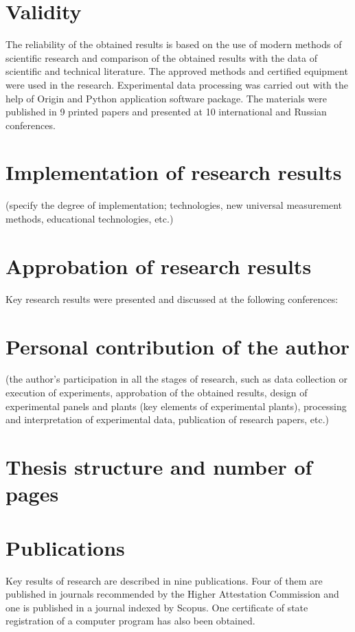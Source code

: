\section*{Validity}
The reliability of the obtained results is based on the use of modern methods of scientific research and comparison of the obtained results with the data of scientific and technical literature. The approved methods and certified equipment were used in the research. Experimental data processing was carried out with the help of Origin and Python application software package. The materials were published in 9 printed papers and presented at 10 international and Russian conferences.

\section*{Implementation of research results}
(specify the degree of implementation; technologies, new universal measurement methods, educational technologies, etc.)

\section*{Approbation of research results}
Key research results were presented and discussed at the following conferences:

\section*{Personal contribution of the author}
(the author's participation in all the stages of research, such as data collection or execution of experiments, approbation of the obtained results, design of experimental panels and plants (key elements of experimental plants), processing and interpretation of experimental data, publication of research papers, etc.)

\section*{Thesis structure and number of pages}
\section*{Publications}
Key results of research are described in nine publications. Four of them are published in journals recommended by the Higher Attestation Commission and one is published in a journal indexed by Scopus. One certificate of state registration of a computer program has also been obtained.\\

